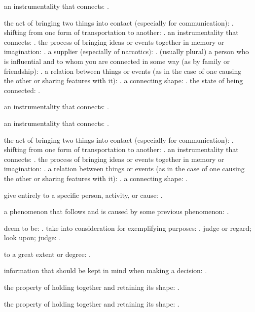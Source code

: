   an instrumentality that connects: .

  the act of bringing two things into contact (especially for communication): . shifting from one form of transportation to another: . an instrumentality that connects: . the process of bringing ideas or events together in memory or imagination: . a supplier (especially of narcotics): . (usually plural) a person who is influential and to whom you are connected in some way (as by family or friendship): . a relation between things or events (as in the case of one causing the other or sharing features with it): . a connecting shape: . the state of being connected: .

  an instrumentality that connects: .

  an instrumentality that connects: .

  the act of bringing two things into contact (especially for communication): . shifting from one form of transportation to another: . an instrumentality that connects: . the process of bringing ideas or events together in memory or imagination: . a relation between things or events (as in the case of one causing the other or sharing features with it): . a connecting shape: .

  give entirely to a specific person, activity, or cause: .

  a phenomenon that follows and is caused by some previous phenomenon: .

  deem to be: . take into consideration for exemplifying purposes: . judge or regard; look upon; judge: .

  to a great extent or degree: .

  information that should be kept in mind when making a decision: .

  the property of holding together and retaining its shape: .

  the property of holding together and retaining its shape: .

